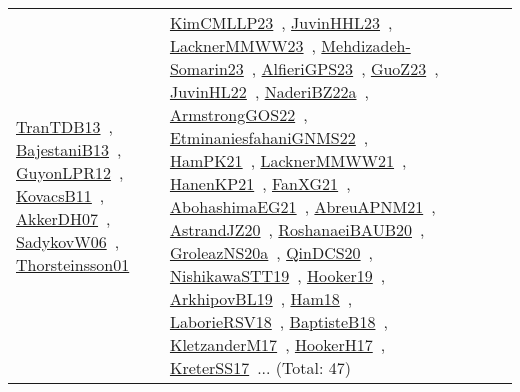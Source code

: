 {\begin{longtable}{lp{3cm}>{\raggedright\arraybackslash}p{6cm}>{\raggedright\arraybackslash}p{6cm}>{\raggedright\arraybackslash}p{8cm}}
\href{works/TranTDB13.pdf}{TranTDB13}~\cite{TranTDB13}, \href{works/BajestaniB13.pdf}{BajestaniB13}~\cite{BajestaniB13}, \href{works/GuyonLPR12.pdf}{GuyonLPR12}~\cite{GuyonLPR12}, \href{works/KovacsB11.pdf}{KovacsB11}~\cite{KovacsB11}, \href{works/AkkerDH07.pdf}{AkkerDH07}~\cite{AkkerDH07}, \href{works/SadykovW06.pdf}{SadykovW06}~\cite{SadykovW06}, \href{works/Thorsteinsson01.pdf}{Thorsteinsson01}~\cite{Thorsteinsson01} & \href{works/KimCMLLP23.pdf}{KimCMLLP23}~\cite{KimCMLLP23}, \href{works/JuvinHHL23.pdf}{JuvinHHL23}~\cite{JuvinHHL23}, \href{works/LacknerMMWW23.pdf}{LacknerMMWW23}~\cite{LacknerMMWW23}, \href{works/Mehdizadeh-Somarin23.pdf}{Mehdizadeh-Somarin23}~\cite{Mehdizadeh-Somarin23}, \href{works/AlfieriGPS23.pdf}{AlfieriGPS23}~\cite{AlfieriGPS23}, \href{works/GuoZ23.pdf}{GuoZ23}~\cite{GuoZ23}, \href{works/JuvinHL22.pdf}{JuvinHL22}~\cite{JuvinHL22}, \href{works/NaderiBZ22a.pdf}{NaderiBZ22a}~\cite{NaderiBZ22a}, \href{works/ArmstrongGOS22.pdf}{ArmstrongGOS22}~\cite{ArmstrongGOS22}, \href{works/EtminaniesfahaniGNMS22.pdf}{EtminaniesfahaniGNMS22}~\cite{EtminaniesfahaniGNMS22}, \href{works/HamPK21.pdf}{HamPK21}~\cite{HamPK21}, \href{works/LacknerMMWW21.pdf}{LacknerMMWW21}~\cite{LacknerMMWW21}, \href{works/HanenKP21.pdf}{HanenKP21}~\cite{HanenKP21}, \href{works/FanXG21.pdf}{FanXG21}~\cite{FanXG21}, \href{works/AbohashimaEG21.pdf}{AbohashimaEG21}~\cite{AbohashimaEG21}, \href{works/AbreuAPNM21.pdf}{AbreuAPNM21}~\cite{AbreuAPNM21}, \href{works/AstrandJZ20.pdf}{AstrandJZ20}~\cite{AstrandJZ20}, \href{works/RoshanaeiBAUB20.pdf}{RoshanaeiBAUB20}~\cite{RoshanaeiBAUB20}, \href{works/GroleazNS20a.pdf}{GroleazNS20a}~\cite{GroleazNS20a}, \href{works/QinDCS20.pdf}{QinDCS20}~\cite{QinDCS20}, \href{works/NishikawaSTT19.pdf}{NishikawaSTT19}~\cite{NishikawaSTT19}, \href{works/Hooker19.pdf}{Hooker19}~\cite{Hooker19}, \href{works/ArkhipovBL19.pdf}{ArkhipovBL19}~\cite{ArkhipovBL19}, \href{works/Ham18.pdf}{Ham18}~\cite{Ham18}, \href{works/LaborieRSV18.pdf}{LaborieRSV18}~\cite{LaborieRSV18}, \href{works/BaptisteB18.pdf}{BaptisteB18}~\cite{BaptisteB18}, \href{works/KletzanderM17.pdf}{KletzanderM17}~\cite{KletzanderM17}, \href{works/HookerH17.pdf}{HookerH17}~\cite{HookerH17}, \href{works/KreterSS17.pdf}{KreterSS17}~\cite{KreterSS17}... (Total: 47)\\

\end{longtable}}
